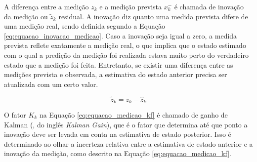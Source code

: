 \documentclass[acronym, symbols, table]{fei}
\begin{document}
				A diferença entre a medição $z_k$ e a medição prevista $x_{k}^{-}$ é chamada de inovação da medição ou $\tilde{z}_k$ residual. A inovação diz quanto uma medida prevista difere de uma medição real, sendo definida segundo a Equação \eqref{eq:equacao_inovacao_medicao}. Caso a inovação seja igual a zero, a medida prevista reflete exatamente a medição real, o que implica que o estado estimado com o qual a predição da medição foi realizada estava muito perto do verdadeiro estado que a medição foi feita. Entretanto, se existir uma diferença entre as medições prevista e observada, a estimativa do estado anterior precisa ser atualizada com um certo valor.
				
				\begin{equation} \label{eq:equacao_inovacao_medicao}
					\tilde{z}_k = z_k - \hat{z}_k
				\end{equation}
				
%				
%			
				
				O fator $K_k$ na Equação \eqref{eq:equacao_medicao_kf} é chamado de ganho de Kalman (, do inglês \textit{Kalman Gain}), que é o fator que determina até que ponto a inovação deve ser levada em conta na estimativa de estado posterior. Isso é determinado ao olhar a incerteza relativa entre a estimativa de estado anterior e a inovação da medição, como descrito na Equação \eqref{eq:equacao_medicao_kf}.
				
\end{document}
